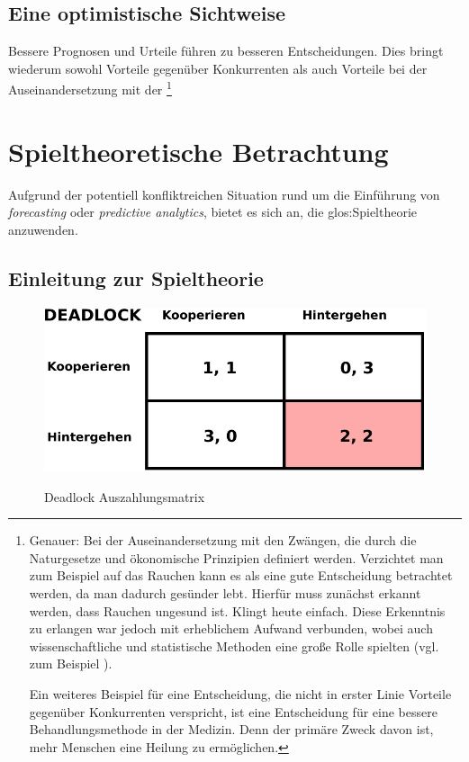 

\subsection{Eine optimistische Sichtweise}



% 

Bessere Prognosen und Urteile führen zu besseren Entscheidungen. Dies bringt
wiederum sowohl Vorteile gegenüber Konkurrenten als auch Vorteile bei der
Auseinandersetzung mit der \grqq\footnote{
Genauer: Bei der Auseinandersetzung mit den Zwängen, die durch die Naturgesetze
und ökonomische Prinzipien definiert werden. Verzichtet man zum Beispiel auf das 
Rauchen kann es als eine gute Entscheidung betrachtet werden, da man dadurch
gesünder lebt. Hierfür muss zunächst erkannt werden, dass Rauchen ungesund ist.
Klingt heute einfach. Diese Erkenntnis zu erlangen war jedoch mit erheblichem
Aufwand verbunden, wobei auch wissenschaftliche und statistische Methoden
eine große Rolle spielten (vgl. zum Beispiel \cite{Proctor}).

Ein weiteres Beispiel für eine Entscheidung, die nicht in erster Linie Vorteile
gegenüber Konkurrenten verspricht, ist eine Entscheidung für eine bessere
Behandlungsmethode in der Medizin. Denn der primäre Zweck davon ist, 
mehr Menschen eine Heilung zu ermöglichen.
}

\section{Spieltheoretische Betrachtung}

Aufgrund der potentiell konfliktreichen Situation rund um die Einführung von
\emph{forecasting} oder \emph{predictive analytics}, bietet es sich an, die
\gls{glos:Spieltheorie} anzuwenden.

\subsection{Einleitung zur Spieltheorie}

\begin{figure}%
\centering
\caption{Deadlock Auszahlungsmatrix}
\includegraphics[scale=0.8]{Grafiken/Deadlock_Ink.pdf} 
\label{pic:Deadlock}
\end{figure}


